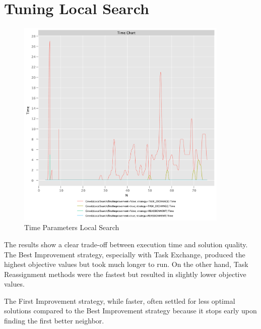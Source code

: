 \documentclass{article}
\begin{document}
\newpage

\section{Tuning Local Search}

\begin{figure}[!h]
    \centering
    \includegraphics[width=0.9\textwidth]{./documentation/assets/new.localSearchParams.timeChart.pdf}
    \caption{Time Parameters Local Search}
    \label{fig:local_time}
\end{figure}\FloatBarrier

The results show a clear trade-off between execution time and solution quality. The Best Improvement strategy, especially with Task Exchange, produced the highest objective values but took much longer to run. On the other hand, Task Reassignment methods were the fastest but resulted in slightly lower objective values.

The First Improvement strategy, while faster, often settled for less optimal solutions compared to the Best Improvement strategy because it stops early upon finding the first better neighbor.
\end{document}
